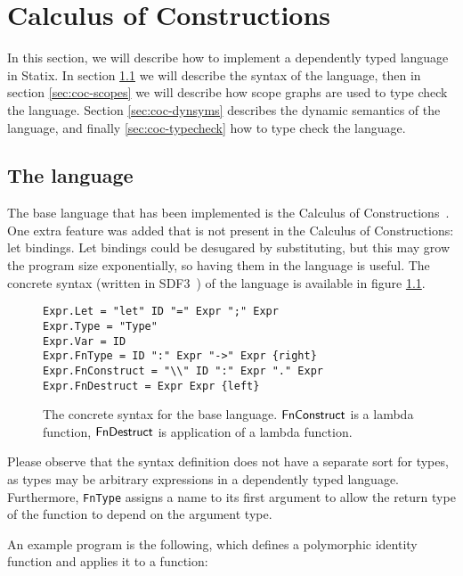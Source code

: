 \chapter{Calculus of Constructions}
\label{chap:baselang}

In this section, we will describe how to implement a dependently typed language in Statix. In section \ref{sec:coc-syntax} we will describe the syntax of the language, then in section \ref{sec:coc-scopes} we will describe how scope graphs are used to type check the language. Section \ref{sec:coc-dynsyms} describes the dynamic semantics of the language, and finally \ref{sec:coc-typecheck} how to type check the language.

\section{The language}
\label{sec:coc-syntax}

The base language that has been implemented is the Calculus of Constructions~\cite{Coquand_Huet_1988}. One extra feature was added that is not present in the Calculus of Constructions: let bindings. Let bindings could be desugared by substituting, but this may grow the program size exponentially, so having them in the language is useful. The concrete syntax (written in SDF3~\cite{sdf3}) of the language is available in figure \ref{fig:syntax}.

\begin{figure}[h]
\begin{lstlisting}
Expr.Let = "let" ID "=" Expr ";" Expr
Expr.Type = "Type"
Expr.Var = ID
Expr.FnType = ID ":" Expr "->" Expr {right}
Expr.FnConstruct = "\\" ID ":" Expr "." Expr
Expr.FnDestruct = Expr Expr {left}
\end{lstlisting}
\caption{The concrete syntax for the base language. $\mathsf{FnConstruct}$ is a lambda function, $\mathsf{FnDestruct}$ is application of a lambda function.}
\label{fig:syntax}
\end{figure}

Please observe that the syntax definition does not have a separate sort for types, as types may be arbitrary expressions in a dependently typed language. Furthermore, \verb|FnType| assigns a name to its first argument to allow the return type of the function to depend on the argument type.

An example program is the following, which defines a polymorphic identity function and applies it to a function:


